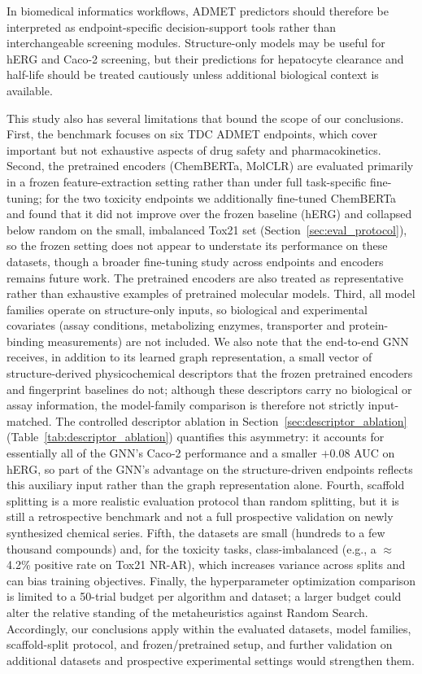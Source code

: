 \documentclass[journal]{IEEEtran}
\begin{document}
In biomedical informatics workflows, ADMET predictors should therefore be interpreted as endpoint-specific decision-support tools rather than interchangeable screening modules. Structure-only models may be useful for hERG and Caco-2 screening, but their predictions for hepatocyte clearance and half-life should be treated cautiously unless additional biological context is available.

This study also has several limitations that bound the scope of our conclusions.
First, the benchmark focuses on six TDC ADMET endpoints, which cover important but not exhaustive aspects of drug safety and pharmacokinetics.
Second, the pretrained encoders (ChemBERTa, MolCLR) are evaluated primarily in a frozen feature-extraction setting rather than under full task-specific fine-tuning; for the two toxicity endpoints we additionally fine-tuned ChemBERTa and found that it did not improve over the frozen baseline (hERG) and collapsed below random on the small, imbalanced Tox21 set (Section~\ref{sec:eval_protocol}), so the frozen setting does not appear to understate its performance on these datasets, though a broader fine-tuning study across endpoints and encoders remains future work. The pretrained encoders are also treated as representative rather than exhaustive examples of pretrained molecular models.
Third, all model families operate on structure-only inputs, so biological and experimental covariates (assay conditions, metabolizing enzymes, transporter and protein-binding measurements) are not included. We also note that the end-to-end GNN receives, in addition to its learned graph representation, a small vector of structure-derived physicochemical descriptors that the frozen pretrained encoders and fingerprint baselines do not; although these descriptors carry no biological or assay information, the model-family comparison is therefore not strictly input-matched. The controlled descriptor ablation in Section~\ref{sec:descriptor_ablation} (Table~\ref{tab:descriptor_ablation}) quantifies this asymmetry: it accounts for essentially all of the GNN's Caco-2 performance and a smaller $+0.08$ AUC on hERG, so part of the GNN's advantage on the structure-driven endpoints reflects this auxiliary input rather than the graph representation alone.
Fourth, scaffold splitting is a more realistic evaluation protocol than random splitting, but it is still a retrospective benchmark and not a full prospective validation on newly synthesized chemical series.
Fifth, the datasets are small (hundreds to a few thousand compounds) and, for the toxicity tasks, class-imbalanced (e.g., a $\approx$4.2\% positive rate on Tox21 NR-AR), which increases variance across splits and can bias training objectives.
Finally, the hyperparameter optimization comparison is limited to a 50-trial budget per algorithm and dataset; a larger budget could alter the relative standing of the metaheuristics against Random Search.
Accordingly, our conclusions apply within the evaluated datasets, model families, scaffold-split protocol, and frozen/pretrained setup, and further validation on additional datasets and prospective experimental settings would strengthen them.
\end{document}
